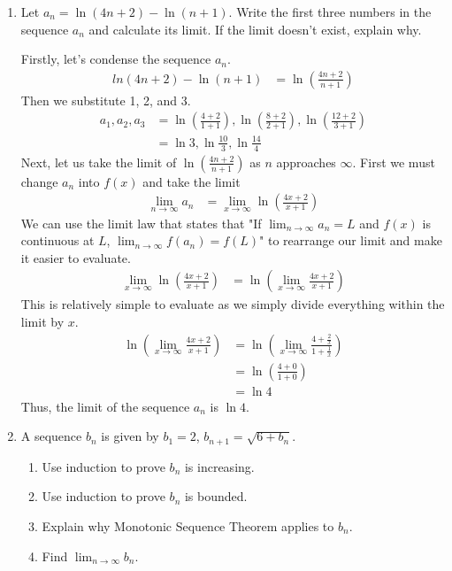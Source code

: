 \documentclass{article}
\begin{document}
\begin{enumerate}[label=\textbf{(9.\arabic*)}]

\item Let $a_n=\ln(4n+2)-\ln(n+1)$. Write the first three numbers in the sequence ${a_n}$ and calculate its limit. If the limit doesn't exist, explain why.

Firstly, let's condense the sequence $a_n$. 
\begin{align*}
ln(4n+2)-\ln(n+1) &= \ln\left(\frac{4n+2}{n+1}\right)
\end{align*}
Then we substitute 1, 2, and 3.
\begin{align*}
a_1, a_2, a_3 &= \ln\left(\frac{4+2}{1+1}\right), \ln\left(\frac{8+2}{2+1}\right), \ln\left(\frac{12+2}{3+1}\right)\\
&= \ln3,\ln\frac{10}{3}, \ln\frac{14}{4}
\end{align*}
Next, let us take the limit of $\ln\left(\frac{4n+2}{n+1}\right)$ as $n$ approaches $\infty$. First we must change $a_n$ into $f(x)$ and take the limit 
\begin{align*}
\lim_{n\to\infty} a_n &= \lim_{x\to\infty} \ln\left(\frac{4x+2}{x+1}\right)
\end{align*}
We can use the limit law that states that "If $\lim_{n\to\infty}a_n=L$ and $f(x)$ is continuous at $L$, $\lim_{n\to\infty}f(a_n)=f(L)$" to rearrange our limit and make it easier to evaluate.
\begin{align*}
\lim_{x\to\infty} \ln\left(\frac{4x+2}{x+1}\right) &= \ln\left(\lim_{x\to\infty} \frac{4x+2}{x+1}\right)
\end{align*}
This is relatively simple to evaluate as we simply divide everything within the limit by $x$.
\begin{align*}
\ln\left(\lim_{x\to\infty} \frac{4x+2}{x+1}\right) &= \ln\left(\lim_{x\to\infty} \frac{4+\frac{2}{x}}{1+\frac{1}{x}}\right)\\
&= \ln\left(\frac{4+0}{1+0}\right)\\
&= \ln4
\end{align*}
Thus, the limit of the sequence $a_n$ is $\ln4$. 

\newpage


\item A sequence $b_n$ is given by $b_1=2$, $b_{n+1}=\sqrt{6+b_n}$.
\begin{enumerate}
\item Use induction to prove ${b_n}$ is increasing.
\item Use induction to prove ${b_n}$ is bounded.
\item Explain why Monotonic Sequence Theorem applies to ${b_n}$.
\item Find $\lim_{n\to\infty}b_n$.
\end{enumerate}



\end{enumerate}
\end{document}
